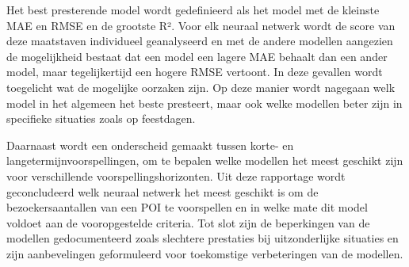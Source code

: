 Het best presterende model wordt gedefinieerd als het model met de kleinste MAE en RMSE en de grootste R². Voor elk neuraal netwerk wordt de score van deze maatstaven individueel geanalyseerd en met de andere modellen aangezien de mogelijkheid bestaat dat een model een lagere MAE behaalt dan een ander model, maar tegelijkertijd een hogere RMSE vertoont. In deze gevallen wordt toegelicht wat de mogelijke oorzaken zijn. Op deze manier wordt nagegaan welk model in het algemeen het beste presteert, maar ook welke modellen beter zijn in specifieke situaties zoals op feestdagen.

Daarnaast wordt een onderscheid gemaakt tussen korte- en langetermijnvoorspellingen, om te bepalen welke modellen het meest geschikt zijn voor verschillende voorspellingshorizonten. Uit deze rapportage wordt geconcludeerd welk neuraal netwerk het meest geschikt is om de bezoekersaantallen van een POI te voorspellen en in welke mate dit model voldoet aan de vooropgestelde criteria. Tot slot zijn de beperkingen van de modellen gedocumenteerd zoals slechtere prestaties bij uitzonderlijke situaties en zijn aanbevelingen geformuleerd voor toekomstige verbeteringen van de modellen.
